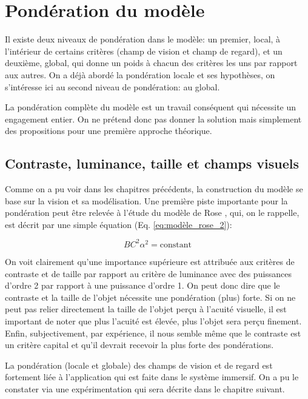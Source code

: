 \chapter{Pondération du modèle}
\par Il existe deux niveaux de pondération dans le modèle: un premier, local, à l'intérieur de certains critères (champ de vision et champ de regard), et un deuxième, global, qui donne un poids à chacun des critères les uns par rapport aux autres. On a déjà abordé la pondération locale et ses hypothèses, on s'intéresse ici au second niveau de pondération: au global.

\par La pondération complète du modèle est un travail conséquent qui nécessite un engagement entier. On ne prétend donc pas donner la solution mais simplement des propositions pour une première approche théorique.

\section{Contraste, luminance, taille et champs visuels}
\par Comme on a pu voir dans les chapitres précédents, la construction du modèle se base sur la vision et sa modélisation. Une première piste importante pour la pondération peut être relevée à l'étude du modèle de Rose \citep{rose_sensitivity_1948}, qui, on le rappelle, est décrit par une simple équation (Eq. \ref{eq:modèle_rose_2}):

\begin{equation}
	BC^2\alpha^2 = \text{constant}
	\label{eq:modèle_rose_2} 
\end{equation}

\par On voit clairement qu'une importance supérieure est attribuée aux critères de contraste et de taille par rapport au critère de luminance avec des puissances d'ordre 2 par rapport à une puissance d'ordre 1. On peut donc dire que le contraste et la taille de l'objet nécessite une pondération (plus) forte. Si on ne peut pas relier directement la taille de l'objet perçu à l'acuité visuelle, il est important de noter que plus l'acuité est élevée, plus l'objet sera perçu finement. Enfin, subjectivement, par expérience, il nous semble même que le contraste est un critère capital et qu'il devrait recevoir la plus forte des pondérations.

\par La pondération (locale et globale) des champs de vision et de regard est fortement liée à l'application qui est faite dans le système immersif. On a pu le constater via une expérimentation qui sera décrite dans le chapitre suivant.

